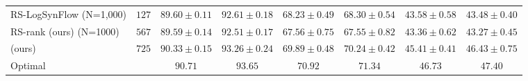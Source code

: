 \documentclass[sigconf]{acmart}
\begin{document}
\begin{table*}[htb]
\begin{tabular}{@{}lccccccc@{}}
        RS-LogSynFlow (N=1,000) & $127$& $89.60 \pm 0.11$ & $92.61 \pm 0.18$ & $68.23 \pm 0.49$ & $68.30 \pm 0.54$  & $43.58 \pm 0.58$ & $43.48 \pm 0.40$ \\ 
        RS-rank (ours) (N=1000) & $567$& $89.59 \pm 0.14$ & $92.51 \pm 0.17$ & $67.56 \pm 0.75$ & $67.55 \pm 0.82$  & $43.36 \pm 0.62$ & $43.27 \pm 0.45$ \\ 
        \palg{} (ours)          & $725$& $90.33 \pm 0.15$ & $93.26 \pm 0.24$ & $69.89 \pm 0.48$ & $70.24 \pm 0.42$  & $45.41 \pm 0.41$ & $46.43 \pm 0.75$ \\ \midrule
        Optimal             &          & $90.71$          & $93.65$          & $70.92$          & $71.34$           & $46.73$          & $47.40$          \\ \bottomrule
        \end{tabular}
        \label{table:overall_sss}
          \vspace{-\baselineskip}
    \end{table*}
\end{document}
